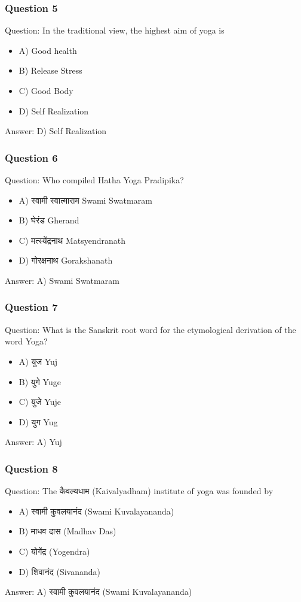 \begin{frame}[fragile]\frametitle{Question 5}
Question: In the traditional view, the highest aim of yoga is
\begin{itemize}
\item A) Good health
\item B) Release Stress
\item C) Good Body
\item D) Self Realization
\end{itemize}
Answer: D) Self Realization
\end{frame}

\begin{frame}[fragile]\frametitle{Question 6}
Question: Who compiled Hatha Yoga Pradipika?
\begin{itemize}
\item A) स्वामी स्वात्माराम  Swami Swatmaram
\item B) घेरंड Gherand
\item C) मत्स्येंद्रनाथ  Matsyendranath
\item D) गोरक्षनाथ Gorakshanath
\end{itemize}
Answer: A) Swami Swatmaram
\end{frame}

\begin{frame}[fragile]\frametitle{Question 7}
Question: What is the Sanskrit root word for the etymological derivation of the word Yoga?
\begin{itemize}
\item A) युज Yuj
\item B) युगे  Yuge
\item C) युजे Yuje
\item D) युग  Yug
\end{itemize}
Answer: A) Yuj
\end{frame}

\begin{frame}[fragile]\frametitle{Question 8}
Question: The कैवल्यधाम (Kaivalyadham) institute of yoga was founded by
\begin{itemize}
\item A) स्वामी  कुवलयानंद   (Swami Kuvalayananda)
\item B) माधव दास (Madhav Das)
\item C) योगेंद्र (Yogendra)
\item D) शिवानंद (Sivananda)
\end{itemize}
Answer: A) स्वामी कुवलयानंद (Swami Kuvalayananda)
\end{frame}

